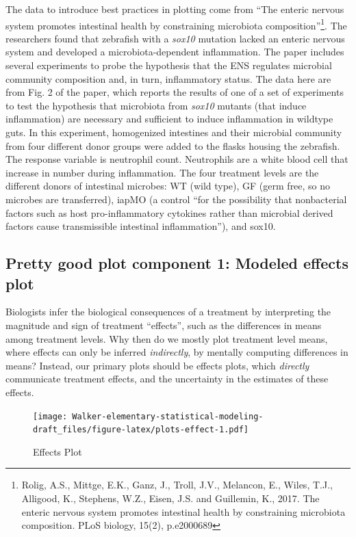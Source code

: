 \documentclass[]{book}
\let\rmarkdownfootnote\footnote%
\def\footnote{\protect\rmarkdownfootnote}
\begin{document}
The data to introduce best practices in plotting come from ``The enteric
nervous system promotes intestinal health by constraining microbiota
composition''\footnote{Rolig, A.S., Mittge, E.K., Ganz, J., Troll, J.V.,
  Melancon, E., Wiles, T.J., Alligood, K., Stephens, W.Z., Eisen, J.S.
  and Guillemin, K., 2017. The enteric nervous system promotes
  intestinal health by constraining microbiota composition. PLoS
  biology, 15(2), p.e2000689}. The researchers found that zebrafish with
a \emph{sox10} mutation lacked an enteric nervous system and developed a
microbiota-dependent inflammation. The paper includes several
experiments to probe the hypothesis that the ENS regulates microbial
community composition and, in turn, inflammatory status. The data here
are from Fig. 2 of the paper, which reports the results of one of a set
of experiments to test the hypothesis that microbiota from \emph{sox10}
mutants (that induce inflammation) are necessary and sufficient to
induce inflammation in wildtype guts. In this experiment, homogenized
intestines and their microbial community from four different donor
groups were added to the flasks housing the zebrafish. The response
variable is neutrophil count. Neutrophils are a white blood cell that
increase in number during inflammation. The four treatment levels are
the different donors of intestinal microbes: WT (wild type), GF (germ
free, so no microbes are transferred), iapMO (a control ``for the
possibility that nonbacterial factors such as host pro-inflammatory
cytokines rather than microbial derived factors cause transmissible
intestinal inflammation''), and sox10.

\subsection{Pretty good plot component 1: Modeled effects
plot}\label{pretty-good-plot-component-1-modeled-effects-plot}

Biologists infer the biological consequences of a treatment by
interpreting the magnitude and sign of treatment ``effects'', such as
the differences in means among treatment levels. Why then do we mostly
plot treatment level means, where effects can only be inferred
\emph{indirectly}, by mentally computing differences in means? Instead,
our primary plots should be effects plots, which \emph{directly}
communicate treatment effects, and the uncertainty in the estimates of
these effects.

\begin{figure}
\centering
\texttt{[image: Walker-elementary-statistical-modeling-draft\_files/figure-latex/plots-effect-1.pdf]}
\caption{\label{fig:plots-effect}Effects Plot}
\end{figure}
\end{document}
